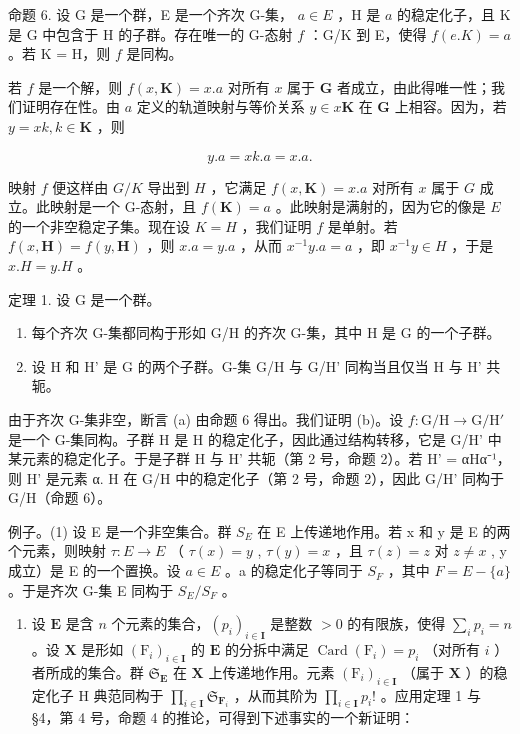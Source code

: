命题 6. 设 G 是一个群，E 是一个齐次 G-集， \(a \in E\) ，H 是 \(a\) 的稳定化子，且 K 是 G 中包含于 H 的子群。存在唯一的 G-态射 \(f\) ：G/K 到 E，使得 \(f(e.K) = a\) 。若 K = H，则 \(f\) 是同构。

若 \(f\) 是一个解，则 \(f(x, \mathbf{K}) = x.a\) 对所有 \(x\) 属于 \(\mathbf{G}\) 者成立，由此得唯一性；我们证明存在性。由 \(a\) 定义的轨道映射与等价关系 \(y \in x\mathbf{K}\) 在 \(\mathbf{G}\) 上相容。因为，若 \(y = xk, k \in \mathbf{K}\) ，则

\[
y. a = x k. a = x. a.
\]

映射 \(f\) 便这样由 \(G / K\) 导出到 \(H\) ，它满足 \(f(x, \mathbf{K}) = x.a\) 对所有 \(x\) 属于 \(G\) 成立。此映射是一个 G-态射，且 \(f(\mathbf{K}) = a\) 。此映射是满射的，因为它的像是 \(E\) 的一个非空稳定子集。现在设 \(K = H\) ，我们证明 \(f\) 是单射。若 \(f(x, \mathbf{H}) = f(y, \mathbf{H})\) ，则 \(x.a = y.a\) ，从而 \(x^{-1}y.a = a\) ，即 \(x^{-1}y \in H\) ，于是 \(x.H = y.H\) 。

定理 1. 设 G 是一个群。

\begin{enumerate}
\def\labelenumi{(\alph{enumi})}
\item
  每个齐次 G-集都同构于形如 G/H 的齐次 G-集，其中 H 是 G 的一个子群。
\item
  设 H 和 H' 是 G 的两个子群。G-集 G/H 与 G/H' 同构当且仅当 H 与 H' 共轭。
\end{enumerate}

由于齐次 G-集非空，断言 (a) 由命题 6 得出。我们证明 (b)。设 \(f: \mathrm{G} / \mathrm{H} \to \mathrm{G} / \mathrm{H}'\) 是一个 G-集同构。子群 H 是 H 的稳定化子，因此通过结构转移，它是 G/H' 中某元素的稳定化子。于是子群 H 与 H' 共轭（第 2 号，命题 2）。若 H' = αHα⁻¹，则 H' 是元素 α. H 在 G/H 中的稳定化子（第 2 号，命题 2），因此 G/H' 同构于 G/H（命题 6）。

例子。(1) 设 E 是一个非空集合。群 \(S_{E}\) 在 E 上传递地作用。若 x 和 y 是 E 的两个元素，则映射 \(\tau: E \to E\) （ \(\tau(x) = y\) , \(\tau(y) = x\) ，且 \(\tau(z) = z\) 对 \(z \neq x\) , y 成立）是 E 的一个置换。设 \(a \in E\) 。a 的稳定化子等同于 \(S_{F}\) ，其中 \(F = E - \{a\}\) 。于是齐次 G-集 E 同构于 \(S_{E}/S_{F}\) 。

\begin{enumerate}
\def\labelenumi{(\arabic{enumi})}
\setcounter{enumi}{1}
\tightlist
\item
  设 \(\mathbf{E}\) 是含 \(n\) 个元素的集合，\((p_i)_{i\in \mathbf{I}}\) 是整数 \(>0\) 的有限族，使得 \(\sum_{i}p_{i} = n\) 。设 \(\mathbf{X}\) 是形如 \((\mathrm{F}_i)_{i\in \mathbf{I}}\) 的 \(\mathbf{E}\) 的分拆中满足 \(\operatorname {Card}(\mathrm{F}_i) = p_i\) （对所有 \(i\) ）者所成的集合。群 \(\mathfrak{S}_{\mathbf{E}}\) 在 \(\mathbf{X}\) 上传递地作用。元素 \((\mathrm{F}_i)_{i\in \mathbf{I}}\) （属于 \(\mathbf{X}\) ）的稳定化子 H 典范同构于 \(\prod_{i\in \mathbf{I}}\mathfrak{S}_{\mathbf{F}_i}\) ，从而其阶为 \(\prod_{i\in \mathbf{I}}p_i!\) 。应用定理 1 与 §4，第 4 号，命题 4 的推论，可得到下述事实的一个新证明：
\end{enumerate}

